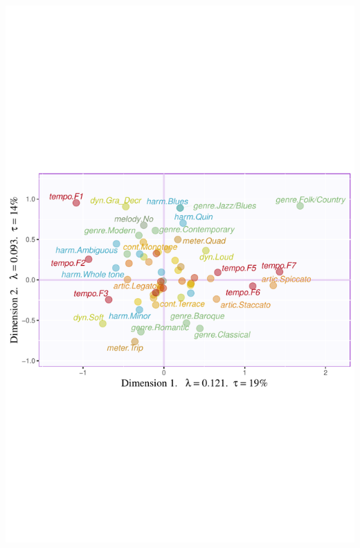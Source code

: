 \documentclass[
]{article}
\begin{document}
\begin{center}\includegraphics[width=1\linewidth]{MusDes_Supplementary_files/figure-latex/colmaps-1} \end{center}
\end{document}
